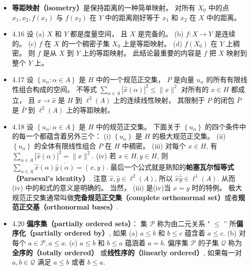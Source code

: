 \begin{itemize}
\item \textbf{等距映射（isometry）}是保持距离的一种简单映射。 对所有 $X_{0}$ 中的点 $x_{1}, x_{2}, f\left(x_{1}\right)$ 与 $f\left(x_{2}\right)$ 在 $Y$ 中的距离刚好等于 $x_{1}$ 和 $x_{2}$ 在 $X$ 中的距离。

\item 4.16 设 (a) $X$ 和 $Y$ 都是度量空间， 且 $X$ 是完备的。 (b) $f: X \rightarrow Y$ 是连续的。 (c) $f$ 在 $X$ 的一个稠密子集 $X_{0}$ 上是等距映射。 (d) $f\left(X_{0}\right)$ 在 $Y$ 上稠密。 则 $f$ 是从 $X$ 到 $Y$ 上的等距映射。 此结论最重要的内容是 $f$ 把 $X$ 映射到整个 $Y$ 上。

\item 4.17 设 $\left\{u_{\alpha}: \alpha \in A\right\}$ 是 $H$ 中的一个规范正交集， $P$ 是向量 $u_{\alpha}$ 的所有有限线性组合构成的空间。 不等式 $\sum_{\alpha \in A}|\hat{x}(\alpha)|^{2} \leqslant\|x\|^{2}$ 对所有的 $x \in H$ 都成立， 且 $x \rightarrow \hat{x}$ 是 $H$ 到 $\ell^{2}(A)$ 上的连续线性映射， 其限制于 $P$ 的闭包 $\bar{P}$ 是 $\bar{P}$ 到 $\ell^{2}(A)$ 上的等距映射。

\item 4.18 设 $\left\{u_{\alpha}: \alpha \in A\right\}$ 是 $H$ 中的规范正交集。 下面关于 $\left\{u_{\alpha}\right\}$ 的四个条件中的每一个都蕴含着另外三个： (i) $\left\{u_{\alpha}\right\}$ 是 $H$ 的极大规范正交集。 (ii) $\left\{u_{\alpha}\right\}$ 的全体有限线性组合 $P$ 在 $H$ 中稠密。 (iii) 对每个 $x \in H$, 有 $\sum_{\alpha \in A}|\hat{x}(\alpha)|^{2}=\|x\|^{2}$. (iv) 若 $x \in H, y \in H$, 则 $\sum_{\alpha \in A} \hat{x}(\alpha) \overline{\hat{y}(\alpha)}=(x, y)$. 最后一个公式就是熟知的\textbf{帕塞瓦尔恒等式（Parseval's identity）}. 注意 $\hat{x},\hat{y} \in \ell^{2}(A)$, 所以 $\hat x\bar{\hat y} \in \ell^1(A)$. 从而 (iv) 中的和式的意义是明确的。 当然， (iii) 是(iv)当 $x=y$ 时的特例。 极大规范正交集通常叫做\textbf{完备规范正交集（complete orthonormal set）}或者\textbf{规范正交基（orthonormal bases）}.

\item 4.20 \textbf{偏序集（partially ordered sets）}： 集 $\mathscr{P}$ 称为由二元关系 " $\leqslant$ ” 所\textbf{偏序化（partially ordered by）}, 如果 (a) $a \leqslant b$ 和 $b \leqslant c$ 蕴含着 $a \leqslant c$. (b) 对每个 $a \in \mathscr{P}, a \leqslant a$. (c) $a \leqslant b$ 和 $b \leqslant a$ 蕴涵着 $a=b$. 偏序集 $\mathscr{P}$ 的子集 $\mathscr{Q}$ 称为\textbf{全序的（totally ordered）} 或\textbf{线性序的（linearly ordered）}, 如果每一对 $a, b \in \mathscr{Q}$ 满足 $a \leqslant b$ 或者 $b \leqslant a$.


\end{itemize}

